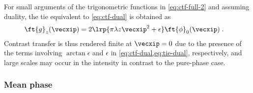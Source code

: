 \documentclass[
twoside,
openright,
titlepage,
numbers=noenddot,
headinclude,
fleqn,
a4paper,
footinclude=true,
cleardoublepage=empty,
abstractoff,
BCOR=5mm,
paper=a4,
fontsize=11pt,
british,ngerman,american,
]{scrreprt}
\begin{document}
For small arguments of the trigonometric functions in
\cref{eq:ctf-full-2} and assuming duality, the \ac{tie} equivalent to
\cref{eq:ctf-dual} is obtained as
\begin{equation}
  \label{eq:tie-dual} 
  \begin{split}
    \ft{g}_z(\vecxip) & = 
    2 \lrp{ \pi\lambda z\vecxip^2 + \epsilon } 
    \ft{\phi}_0(\vecxip) \;.
  \end{split}
\end{equation}
Contrast transfer is thus rendered finite at $\vecxip =0$ due to the
presence of the terms involving $\arctan\epsilon$ and $\epsilon$ in
\cref{eq:ctf-dual,eq:tie-dual}, respectively, and large scales may
occur  in the intensity in contrast to the pure-phase case.


\subsubsection{Mean phase}
\label{sec:mean-phase}
\end{document}
